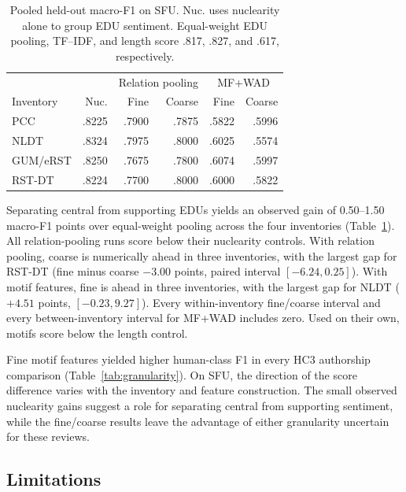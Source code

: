 \begin{table}[t]
  \centering
  \small
  \setlength{\tabcolsep}{3.5pt}
  \begin{tabular}{@{}lrrrrr@{}}
    \hline
    & & \multicolumn{2}{c}{Relation pooling} & \multicolumn{2}{c}{MF+WAD} \\
    Inventory & Nuc. & Fine & Coarse & Fine & Coarse \\
    \hline
    PCC      & .8225 & .7900 & .7875 & .5822 & .5996 \\
    NLDT     & .8324 & .7975 & .8000 & .6025 & .5574 \\
    GUM/eRST & .8250 & .7675 & .7800 & .6074 & .5997 \\
    RST-DT   & .8224 & .7700 & .8000 & .6000 & .5822 \\
    \hline
  \end{tabular}
  \caption{Pooled held-out macro-F1 on SFU. Nuc. uses nuclearity alone to
    group EDU sentiment. Equal-weight EDU pooling, TF--IDF, and length
    score .817, .827, and .617, respectively.}
  \label{tab:sfu-granularity}
\end{table}

Separating central from supporting EDUs yields an observed gain of
0.50--1.50 macro-F1 points over equal-weight pooling across the four
inventories (Table~\ref{tab:sfu-granularity}). All relation-pooling runs
score below their nuclearity controls. With relation pooling, coarse is
numerically ahead in three inventories, with the largest gap for RST-DT
(fine minus coarse $-3.00$ points, paired interval $[-6.24,0.25]$). With
motif features, fine is ahead in three inventories, with the largest gap
for NLDT ($+4.51$ points, $[-0.23,9.27]$). Every within-inventory
fine/coarse interval and every between-inventory interval for MF+WAD
includes zero. Used on their own, motifs score below the length control.

Fine motif features yielded higher human-class F1 in every HC3 authorship
comparison (Table~\ref{tab:granularity}). On SFU, the direction of the
score difference varies with the inventory and feature construction.
The small observed nuclearity gains suggest a role for separating central
from supporting sentiment, while the fine/coarse results leave the
advantage of either granularity uncertain for these reviews.

\subsection{Limitations}

